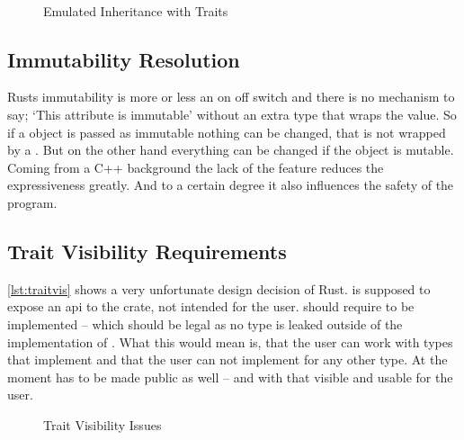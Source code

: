 \documentclass[thesis]{subfiles}
\begin{document}
    \newsavebox{\staticThree}
    \begin{lrbox}{\staticThree}
      
    \end{lrbox}

    \begin{figure}[ht]
      \captionsetup{type=lstlisting}
      \usebox{\staticOne}\hfill%
      \usebox{\staticTwo}\\%
      \usebox{\staticThree}
      \caption{Emulated Inheritance with Traits}\label{lst:static}
    \end{figure}

  \subsection{Immutability Resolution}
    Rusts immutability is more or less an on off switch and there is no mechanism to say; `This attribute is immutable' without an extra type that wraps the value.
    So if a object is passed as immutable nothing can be changed, that is not wrapped by a \UnsafeCellT.
    But on the other hand everything can be changed if the object is mutable.
    Coming from a C++ background the lack of the  feature reduces the expressiveness greatly.
    And to a certain degree it also influences the safety of the program.

  \subsection{Trait Visibility Requirements}
    \autoref{lst:traitvis} shows a very unfortunate design decision of Rust.
     is supposed to expose an \gls{api} to the crate, not intended for the user.
     should require \A to be implemented -- which should be legal as no type is leaked outside of the implementation of \B.
    What this would mean is, that the user can work with types that implement \B and that the user can not implement \B for any other type.
    At the moment  has to be made public as well -- and with that visible and usable for the user.

    \begin{figure}[ht]
      \captionsetup{type=lstlisting}
      
      \caption{Trait Visibility Issues}\label{lst:traitvis}
    \end{figure}
\end{document}
